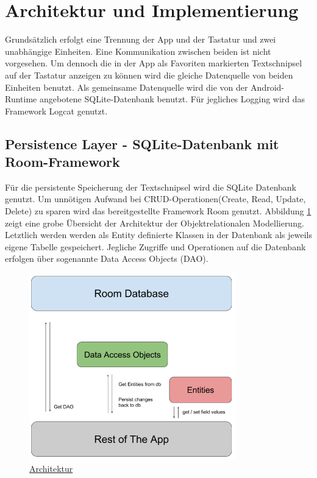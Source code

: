 \documentclass[11pt]{article}
\begin{document}
	
	\section{Architektur und Implementierung}
	Grundsätzlich erfolgt eine Trennung der App und der Tastatur und zwei unabhängige Einheiten.
	Eine Kommunikation zwischen beiden ist nicht vorgesehen.
	Um dennoch die in der App als Favoriten markierten Textschnipsel auf der Tastatur anzeigen zu können wird die gleiche Datenquelle von beiden Einheiten benutzt.
	Als gemeinsame Datenquelle wird die von der Android-Runtime angebotene SQLite-Datenbank benutzt.
	Für jegliches Logging wird das Framework Logcat genutzt.
	
	\subsection{Persistence Layer - SQLite-Datenbank mit Room-Framework}
	Für die persistente Speicherung der Textschnipsel wird die SQLite Datenbank genutzt. 
	Um unnötigen Aufwand bei CRUD-Operationen(Create, Read, Update, Delete) zu sparen wird das  bereitgestellte Framework Room genutzt. \newline
	Abbildung \ref{fig:room_arch} zeigt eine grobe Übersicht der Architektur der Objektrelationalen Modellierung. Letztlich werden werden als Entity definierte Klassen in der Datenbank als jeweils eigene Tabelle gespeichert. Jegliche Zugriffe und Operationen auf die Datenbank erfolgen über sogenannte Data Access Objects (DAO). 
	
	\begin{figure}[H]
		\centering
		\includegraphics[width=0.8\textwidth]{Konzepte/room_architecture.png}
		\caption{\href{https://developer.android.com/training/data-storage/room/}{Architektur}}
		\label{fig:room_arch}
	\end{figure}
	
\end{document}
